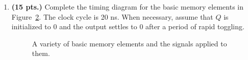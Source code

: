 \begin{enumerate}
\begin{figure}[ht]
\label{fig:nand}
\caption{A 2-stage sequential circuit.}
\label{fig:DMS}
\end{figure}

\item {\bf (15 pts.)} Complete the timing diagram for the basic memory 
elements in Figure~\ref{fig:ExTim}.  The clock cycle is 20 ns. When 
necessary, assume that $Q$ is initialized to 0 and the output settles to 
0 after a period of rapid toggling. 

\begin{figure}[ht]
\caption{A variety of basic memory elements and the signals applied to them.}
\label{fig:ExTim}
\end{figure}

\begin{solution}{
\begin{figure}[ht]
\end{figure}
} \end{solution}



\end{enumerate}
